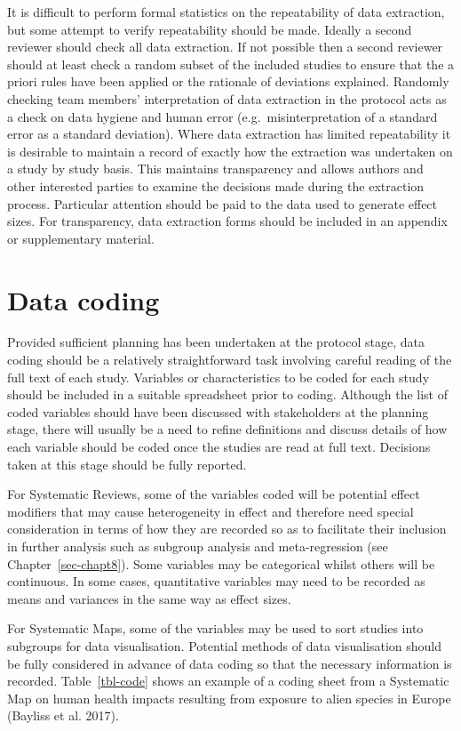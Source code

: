 \documentclass[
  letterpaper,
  DIV=11,
  numbers=noendperiod]{scrreprt}
\begin{document}
It is difficult to perform formal statistics on the repeatability of
data extraction, but some attempt to verify repeatability should be
made. Ideally a second reviewer should check all data extraction. If not
possible then a second reviewer should at least check a random subset of
the included studies to ensure that the a priori rules have been applied
or the rationale of deviations explained. Randomly checking team
members' interpretation of data extraction in the protocol acts as a
check on data hygiene and human error (e.g.~misinterpretation of a
standard error as a standard deviation). Where data extraction has
limited repeatability it is desirable to maintain a record of exactly
how the extraction was undertaken on a study by study basis. This
maintains transparency and allows authors and other interested parties
to examine the decisions made during the extraction process. Particular
attention should be paid to the data used to generate effect sizes. For
transparency, data extraction forms should be included in an appendix or
supplementary material.

\section{Data coding}\label{data-coding}

Provided sufficient planning has been undertaken at the protocol stage,
data coding should be a relatively straightforward task involving
careful reading of the full text of each study. Variables or
characteristics to be coded for each study should be included in a
suitable spreadsheet prior to coding. Although the list of coded
variables should have been discussed with stakeholders at the planning
stage, there will usually be a need to refine definitions and discuss
details of how each variable should be coded once the studies are read
at full text. Decisions taken at this stage should be fully reported.

For Systematic Reviews, some of the variables coded will be potential
effect modifiers that may cause heterogeneity in effect and therefore
need special consideration in terms of how they are recorded so as to
facilitate their inclusion in further analysis such as subgroup analysis
and meta-regression (see Chapter~\ref{sec-chapt8}). Some variables may
be categorical whilst others will be continuous. In some cases,
quantitative variables may need to be recorded as means and variances in
the same way as effect sizes.

For Systematic Maps, some of the variables may be used to sort studies
into subgroups for data visualisation. Potential methods of data
visualisation should be fully considered in advance of data coding so
that the necessary information is recorded. Table~\ref{tbl-code} shows
an example of a coding sheet from a Systematic Map on human health
impacts resulting from exposure to alien species in Europe (Bayliss et
al. 2017).
\end{document}
